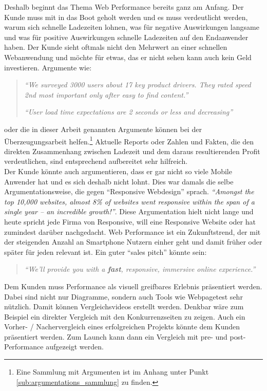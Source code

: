 	Deshalb beginnt das Thema Web Performance bereits ganz am Anfang. Der Kunde muss mit in das Boot geholt werden und es muss verdeutlicht werden, warum sich schnelle Ladezeiten lohnen, was für negative Auswirkungen langsame und was für positive Auswirkungen schnelle Ladezeiten auf den Endanwender haben. Der Kunde sieht oftmals nicht den Mehrwert an einer schnellen Webanwendung und möchte für etwas, das er nicht sehen kann auch kein Geld investieren. Argumente wie:
	\begin{quote}
		\textit{"`We surveyed 3000 users about 17 key product drivers. They rated speed 2nd most important only after easy to find content."'} \autocite[p. 8]{hamann14}

		\textit{"`User load time expectations are 2 seconds or less and decreasing"'} \autocite{bixby13}
	\end{quote}
	oder die in dieser Arbeit genannten Argumente können bei der Überzeugungsarbeit helfen.\footnote{Eine Sammlung mit Argumenten ist im Anhang unter Punkt \ref{sub:argumentations_sammlung} zu finden.} Aktuelle Reports oder Zahlen und Fakten, die den direkten Zusammenhang zwischen Ladezeit und dem daraus resultierenden Profit verdeutlichen, sind entsprechend aufbereitet sehr hilfreich.\\
	Der Kunde könnte auch argumentieren, dass er gar nicht so viele Mobile Anwender hat und es sich deshalb nicht lohnt. Dies war damals die selbe Argumentationsweise, die gegen "`Responsive Webdesign"' sprach. \textit{"`Amongst the top 10,000 websites, almost 8\% of websites went responsive within the span of a single year – an incredible growth!"'}\autocite{guypo14}. Diese Argumentation hielt nicht lange und heute spricht jede Firma von Responsive, will eine Responsive Website oder hat zumindest darüber nachgedacht.\autocite{guypo14} Web Performance ist ein Zukunftstrend, der mit der steigenden Anzahl an Smartphone Nutzern einher geht und damit früher oder später für jeden relevant ist. Ein guter "`sales pitch"' könnte sein:
	\begin{quote}
		 \textit{"`We'll provide you with a \textbf{fast}, responsive, immersive online experience."'}\autocite[p. 32]{kovalcin15}
	\end{quote}
	Dem Kunden muss Performance als visuell greifbares Erlebnis präsentiert werden. Dabei sind nicht nur Diagramme, sondern auch Tools wie Webpagetest sehr nützlich. Damit können Vergleichsvideos erstellt werden. Denkbar wäre zum Beispiel ein direkter Vergleich mit den Konkurrenzseiten zu zeigen. Auch ein Vorher- / Nachervergleich eines erfolgreichen Projekts könnte dem Kunden präsentiert werden. Zum Launch kann dann ein Vergleich mit pre- und post-Performance aufgezeigt werden.\\

